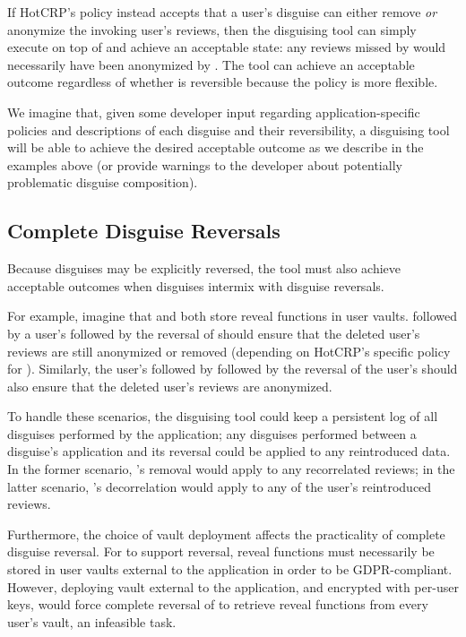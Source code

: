 If HotCRP's policy instead accepts that a user's \gdpr disguise can either remove \emph{or}
anonymize the invoking user's reviews, then the disguising tool can simply execute \gdpr on top of
\ca and achieve an acceptable state: any reviews missed by \gdpr would necessarily have been
anonymized by \ca.  The tool can achieve an acceptable outcome regardless of whether \ca is
reversible because the policy is more flexible.

We imagine that, given some developer input regarding application-specific policies and descriptions
of each disguise and their reversibility, a disguising tool will be able to achieve the desired acceptable
outcome as we describe in the examples above (or provide warnings to the developer about potentially
problematic disguise composition).

\subsection{Complete Disguise Reversals}
Because disguises may be explicitly reversed, the tool must also achieve acceptable outcomes when disguises intermix with
disguise reversals.

For example, imagine that \ca and \gdpr both store reveal functions in user vaults. 
%
\ca followed by a user's \gdpr followed by the reversal of \ca should ensure that the deleted user's
reviews are still anonymized or removed (depending on HotCRP's specific policy for \gdpr).
Similarly, the user's \gdpr followed by \ca followed by the reversal of the user's \gdpr should also
ensure that the deleted user's reviews are anonymized.

To handle these scenarios, the disguising tool could keep a persistent log of all disguises
performed by the application; any disguises performed between a disguise's application and its
reversal could be applied to any reintroduced data. In the former scenario, \gdpr's removal would
apply to any recorrelated reviews; in the latter scenario, \ca's decorrelation would apply to any of
the user's reintroduced reviews.

Furthermore, the choice of vault deployment affects the practicality of complete disguise reversal.
For \gdpr to support reversal, reveal functions must necessarily be stored in user vaults external
to the application in order to be GDPR-compliant.
However, deploying vault external to the application, and encrypted with per-user keys, would force complete reversal of \ca to retrieve reveal functions from every user's vault, an infeasible task.
